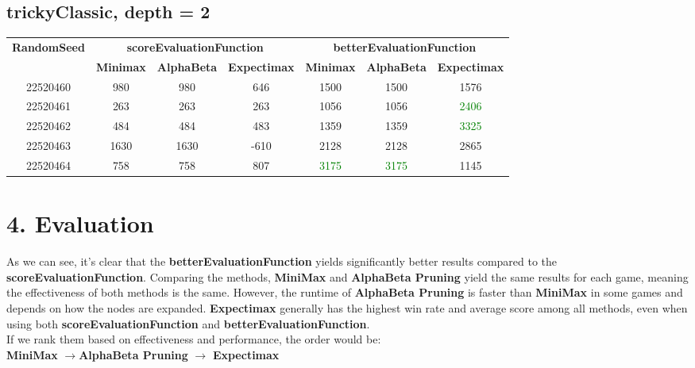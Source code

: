 \documentclass[english, a4paper,12pt]{article}
\begin{document}
\subsection*{trickyClassic, depth = 2}
\small\begin{tabular}{|c|c|c|c|c|c|c|}
\hline
\textbf{RandomSeed} & \multicolumn{3}{c|}{\textbf{scoreEvaluationFunction}} & \multicolumn{3}{c|}{\textbf{betterEvaluationFunction}} \\
\cline{2-7}
& \textbf{Minimax} & \textbf{AlphaBeta} & \textbf{Expectimax} & \textbf{Minimax} & \textbf{AlphaBeta} & \textbf{Expectimax} \\
\hline
22520460 & \textcolor{red!70}{980} & \textcolor{red!70}{980} & \textcolor{red!70}{646} & \textcolor{red!70}{1500} & \textcolor{red!70}{1500} & \textcolor{red!70}{1576} \\
22520461 & \textcolor{red!70}{263} & \textcolor{red!70}{263} & \textcolor{red!70}{263} & \textcolor{red!70}{1056} & \textcolor{red!70}{1056} & \textcolor{Green}{2406} \\
22520462 & \textcolor{red!70}{484} & \textcolor{red!70}{484} & \textcolor{red!70}{483} & \textcolor{red!70}{1359} & \textcolor{red!70}{1359} & \textcolor{Green}{3325} \\
22520463 & \textcolor{red!70}{1630} & \textcolor{red!70}{1630} & \textcolor{red!70}{-610} & \textcolor{red!70}{2128} & \textcolor{red!70}{2128} & \textcolor{red!70}{2865} \\
22520464 & \textcolor{red!70}{758} & \textcolor{red!70}{758} & \textcolor{red!70}{807} & \textcolor{Green}{3175} & \textcolor{Green}{3175} & \textcolor{red!70}{1145} \\
\hline
\end{tabular}
\section*{4. Evaluation}
\normalsize\hspace*{7mm}As we can see, it’s clear that the \textbf{betterEvaluationFunction} yields significantly better results compared to the \textbf{scoreEvaluationFunction}. Comparing the methods, \textbf{MiniMax} and \textbf{AlphaBeta Pruning} yield the same results for each game, meaning the effectiveness of both methods is the same. However, the runtime of \textbf{AlphaBeta Pruning} is faster than \textbf{MiniMax} in some games and depends on how the nodes are expanded. \textbf{Expectimax} generally has the highest win rate and average score among all methods, even when using both \textbf{scoreEvaluationFunction} and \textbf{betterEvaluationFunction}.\vspace*{3mm}\\
\normalsize If we rank them based on effectiveness and performance, the order would be:\\ \hspace*{7mm} \textbf{MiniMax}  $\rightarrow$\textbf{AlphaBeta Pruning} $\rightarrow$ \textbf{Expectimax}
\end{document}
